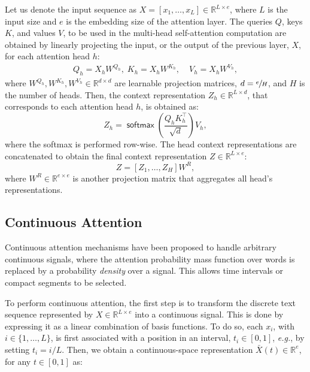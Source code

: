 \documentclass[11pt]{article}
\DeclareMathOperator*{\softmax}{\mathsf{softmax}}
\begin{document}
Let us denote the input sequence as ${X =[x_1,\dots,x_L]  \in \mathbb{R}^{L \times e}} $, where $L$ is the input size and $e$ is the embedding size of the attention layer.
The queries $Q$, keys $K$, and values $V$, to be used in the multi-head self-attention computation are obtained by linearly projecting the input, or the output of the previous layer, $X$, for each attention head $h$: 
\begin{align}
    \!\!\! Q_h = X_h W^{Q_h},\; K_h = X_h W^{K_h},\; & V_h = X_h W^{V_h},\!
\end{align}
where ${W^{Q_h}, W^{K_h}, W^{V_h} \in \mathbb{R}^{d\times d}}$ are learnable projection matrices, $d=\sfrac{e}{H}$, and $H$ is the number of heads. 
Then, the context representation ${Z_h \in \mathbb{R}^{L\times d}}$, that corresponds to each attention head $h$, is obtained as:
\begin{equation}\label{transformer_dot}
    Z_h = \softmax \left( \dfrac{Q_h K_h ^\top}{\sqrt{d}} \right)  V_h,
\end{equation}
where the softmax is performed row-wise.
The head context representations are concatenated to obtain the final context representation ${Z \in \mathbb{R}^{L\times e}}$:
\begin{equation}\label{eq:context_representation}
    Z = [Z_1,\dots,Z_{H}]W^R,
\end{equation}
where ${W^R \in \mathbb{R}^{e \times e}}$ is another projection matrix that aggregates all head's representations. 


\subsection{Continuous Attention}

Continuous attention mechanisms \citep{martins2020sparse} have been proposed to handle arbitrary continuous signals, where the attention probability mass function over words is replaced by a probability \textit{density} over a signal. This allows time intervals or compact segments to be selected. 

To perform continuous attention, the first step is to transform the discrete text sequence represented by ${X \in \mathbb{R}^{L\times e}}$ into a continuous signal. 
This is done by expressing it as a linear combination of basis functions.
To do so, each $x_i$, with ${i \in \{1,\dots,L\}}$, is first associated with a position in an interval, ${t_i \in [0,1]}$, \textit{e.g.}, by setting $t_i = i/L$. Then, 
we obtain a continuous-space representation ${\bar{X}(t) \in \mathbb{R}^e}$, for any $t \in [0,1]$ as:
\end{document}
